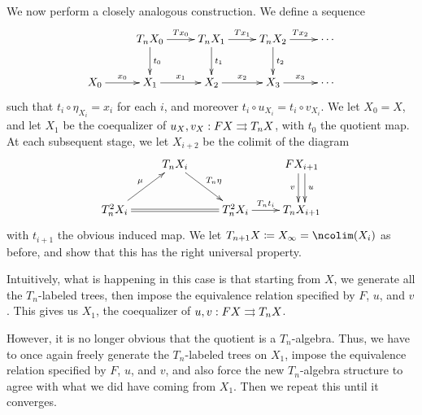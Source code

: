\documentclass{amsart}
\begin{document}
We now perform a closely analogous construction.
We define a sequence
\begin{equation}
  \vcenter{\xymatrix{
       &
       T_n X_0\ar[r]^{T x_0}\ar[d]^{t_0} &
       T_n X_1\ar[r]^{T x_1}\ar[d]^{t_1} &
       T_n X_2\ar[r]^{T x_2}\ar[d]^{t_2} &
       \cdots \\
       X_0\ar[r]^{x_0} &
       X_1\ar[r]^{x_1} &
       X_2\ar[r]^{x_2} &
       X_3\ar[r]^{x_3} &
       \cdots
      }}
\end{equation}
such that $t_i \circ \eta_{X_i}= x_i$ for each $i$, and moreover $t_i \circ u_{X_i} = t_i \circ v_{X_i}$.
We let $X_0=X$, and let $X_1$ be the coequalizer of $u_X,v_X: F X \rightrightarrows T_n X$, with $t_0$ the quotient map.
At each subsequent stage, we let $X_{i+2}$ be the colimit of the diagram
\begin{equation}
  \vcenter{\xymatrix{
      & T_n X_i \ar[dr]^{T_n \eta} &&
      F X_{i+1} \ar@<1mm>[d]^u \ar@<-1mm>[d]_v \\
      T_n^2 X_i \ar@{=}[rr]\ar[ur]^{\mu} &&
      T_n^2 X_i \ar[r]^-{T_n t_i } &
      T_n X_{i+1}
    }}
\end{equation}
with $t_{i+1}$ the obvious induced map.
We let $T_{n+1} X \coloneqq X_\infty = \ncolim (X_i)$ as before, and show that this has the right universal property.

Intuitively, what is happening in this case is that starting from $X$, we generate all the $T_n$-labeled trees, then impose the equivalence relation specified by $F$, $u$, and $v$.
This gives us $X_1$, the coequalizer of $u,v:FX \rightrightarrows T_n X$.

However, it is no longer obvious that the quotient is a $T_n$-algebra.
Thus, we have to once again freely generate the $T_n$-labeled trees on $X_1$, impose the equivalence relation specified by $F$, $u$, and $v$, and also force the new $T_n$-algebra structure to agree with what we did have coming from $X_1$.
Then we repeat this until it converges.

\end{document}
